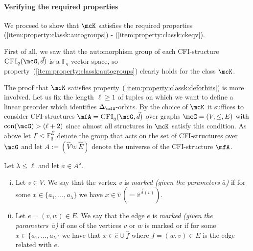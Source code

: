 \documentclass[a4paper,UKenglish]{lipics}
\newcommand{\defeq}{:=}
\newcommand{\field}[1]{\mathbb{#1}}
\newcommand{\con}{\ensuremath{\text{con}}\xspace}
\newcommand{\ba}{{\bar a}}
\newcommand{\vct}[1]{\vec{#1}}
\theoremstyle{plain}
\begin{document}
\paragraph*{Verifying the required properties}
We proceed to show that $\mcK$ 
satisfies the required properties
(\ref{item:property:classk:autogroups}) - 
(\ref{item:property:classk:ckeqv}).

First of all, we saw that the automorphism group of each CFI-structure 
$\CFI(\mcG, \vct d)$ is a $\field F_q$-vector space, so 
property~(\ref{item:property:classk:autogroups}) clearly holds for the class 
$\mcK$.

The proof that $\mcK$ satisfies property~(\ref{item:property:classk:deforbits}) 
is more involved.
Let us fix the length $\ell \geq 1$ of tuples on which we want to 
define a linear preorder which identifies $\Delta_\mfA$-orbits.
By the choice of $\mcK$ it suffices to consider CFI-structures $\mfA = 
\CFI(\mcG, \vec d)$ over graphs $\mcG = (V, \leq, E)$ 
with $\con(\mcG) > (\ell + 2)$ since almost all structures in $\mcK$
satisfy this condition.
As above let $\Gamma \leq \field F^E_q$ denote the group that acts on the set 
of 
CFI-structures over $\mcG$ and let $A \defeq (\hat V \uplus \hat E)$ denote 
the universe of the 
CFI-structure $\mfA$.

\begin{definition}
 Let $\lambda \leq \ell$ and let $\ba \in A^\lambda$.

 \begin{enumerate}[(i)]
  \item Let $v \in V$. 
  We say that the vertex $v$ is \emph{marked (given the parameters $\ba$)} 
if for some $x \in \{ a_1, \dots, a_\lambda \}$ we have $x \in \hat v \, (= 
\hat{v}^{\vct d(v)})$.
  \item Let $e = (v,w) \in E$. 
  We say that the edge $e$ is \emph{marked (given the parameters~$\ba$)} 
if one of the vertices $v$ or $w$ is marked or if for some $x \in \{ a_1, 
\dots, a_\lambda \}$ we have that $x \in \hat e \cup \hat f$ where $f = 
(w,v) \in E$ is the edge related with $e$.
 \end{enumerate}
 \end{definition}
 
\end{document}
